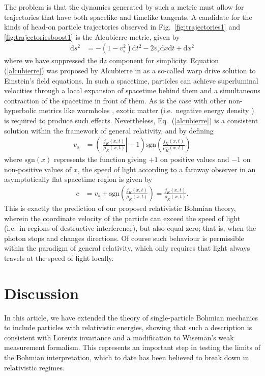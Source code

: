 \documentclass[
prx
,twocolumn
,nofootinbib
,floatfix
,superscriptaddress
]{revtex4-2}
\newcommand{\D}{\mathrm{d}}
\begin{document}
The problem is that the dynamics generated by such a metric must allow for trajectories that have both spacelike and timelike tangents. A candidate for the kinds of head-on particle trajectories observed in Fig.\ \ref{fig:trajectories1} and \ref{fig:trajectoriesboost1} is the Alcubierre metric, given by 
\begin{align}\label{alcubierre}
    \D s^2 &= - (1 - v_s^2) \D t^2 - 2 v_s \D x \D t + \D x^2 
\end{align}
where we have suppressed the $\D z$ component for simplicity. Equation (\ref{alcubierre}) was proposed by Alcubierre in \cite{Alcubierre_1994} as a so-called warp drive solution to Einstein's field equations. In such a spacetime, particles can achieve superluminal velocities through a local expansion of spacetime behind them and a simultaneous contraction of the spacetime in front of them. As is the case with other non-hyperbolic metrics like wormholes
\cite{einsteinPhysRev.48.73,morrisdoi:10.1119/1.15620}, exotic matter (i.e.\ negative energy density \cite{fordPhysRevD.55.2082}) is required to produce such effects. Nevertheless, Eq.\ (\ref{alcubierre}) is a consistent solution within the framework of general relativity, and by defining
\begin{align}
    v_s &= \left( \left| \frac{j_{K}(x,t)}{\rho_{K}(x,t)} \right| - 1 \right) \text{sgn} \left( \frac{j_{K}(x,t)}{\rho_{K}(x,t)} \right) 
\end{align}
where $\text{sgn}(x)$ represents the function giving $+1$ on positive values and $-1$ on non-positive values of $x$, the speed of light according to a faraway observer in an asymptotically flat spacetime region is given by
\begin{align}
    c &= v_s + \text{sgn}\left(\frac{j_K(x,t)}{\rho_K(x,t)} \right) = \frac{j_K(x,t)}{\rho_K(x,t)} .
\end{align}
This is exactly the prediction of our proposed relativistic Bohmian theory, wherein the coordinate velocity of the particle can exceed the speed of light (i.e.\ in regions of destructive interference), but also equal zero; that is, when the photon stops and changes directions. Of course such behaviour is permissible within the paradigm of general relativity, which only requires that light always travels at the speed of light locally.

\section{Discussion}
In this article, we have extended the theory of single-particle Bohmian mechanics to include particles with relativistic energies, showing that such a description is consistent with Lorentz invariance and a modification to Wiseman's weak measurement formalism. This represents an important step in testing the limits of the Bohmian interpretation, which to date has been believed to break down in relativistic regimes.
\end{document}
